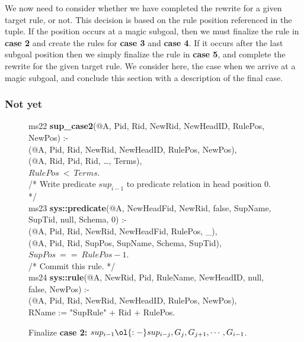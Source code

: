 We now need to consider whether we have completed the rewrite for a given
target rule, or not.  This decision is based on the rule position referenced in
the  tuple.  If the position occurs at a magic subgoal, then we must
finalize the rule in {\bf case 2} and create the rules for {\bf case 3} and
{\bf case 4}.  If it occurs after the last subgoal position then we simply
finalize the rule in {\bf case 5}, and complete the rewrite for the given
target rule.  We consider here, the case when we arrive at a magic subgoal, and
conclude this section with a description of the final case.

\subsubsection{Not yet}

\begin{figure}[!t]
\ssp
\centering
\begin{boxedminipage}{\linewidth}
ms22 {\bf sup\_case2}(@A, Pid, Rid, NewRid, NewHeadID, RulePos, NewPos) :- \\
(@A, Pid, Rid, NewRid, NewHeadID, RulePos, NewPos), \\
(@A, Rid, Pid, Rid, \ldots, Terms), \\
\datalogspace $RulePos\ <\ Terms$. \\

/* Write predicate $sup_{i-1}$ to predicate relation in head position $0$. */ \\
ms23 {\bf sys::predicate}(@A, NewHeadFid, NewRid, false, SupName, SupTid, null, Schema, 0) :- \\
(@A, Pid, Rid, NewRid, NewHeadFid, RulePos, \_), \\
(@A, Pid, Rid, SupPos, SupName, Schema, SupTid), \\
\datalogspace $SupPos\ ==\ RulePos - 1$. \\
  
/* Commit this rule. */ \\
ms24 {\bf sys::rule}(@A, NewRid, Pid, RuleName, NewHeadID, null, false, NewPos) :- \\
(@A, Pid, Rid, NewRid, NewHeadID, RulePos, NewPos), \\
\datalogspace RName := "SupRule" + Rid + RulePos.

\end{boxedminipage}
\caption{\label{ch:magic:fig:rewrite5} 
Finalize {\bf case 2:} $sup_{i-1} \ol{:-} sup_{i-j}, G_j, G_{j+1}, \cdots, G_{i-1}$.}
\end{figure}

